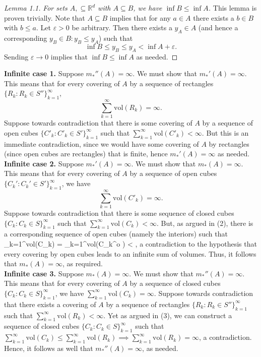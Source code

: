 \begin{proof}[Lemma 1.1]
\emph{For sets \( A, \subseteq \mathbb{R}^{d}  \) with \( A \subseteq B \), we have \( \inf B \leq \inf A \).}
This lemma is proven trivially. Note that \( A \subseteq B \) implies that for any \( a \in A \) there exists a \( b \in B \) with \( b \leq a \). Let \( \varepsilon > 0 \) be arbitrary. Then there exists a \( y_A \in A \) (and hence a corresponding \( y_B \in B : y_B \leq y_A \)) such that \[\inf B \leq y_B \leq y_A < \inf A + \varepsilon.\] Sending \( \varepsilon  \to 0 \) implies that \( \inf B \leq \inf A \) as needed.
\end{proof}

\noindent \textbf{Infinite case 1.} Suppose \( m_*''(A) = \infty  \). We must show that \( m_*'(A) = \infty  \). This means that for every covering of \( A \) by a sequence of rectangles \( \{ R_k : R_k \in S''\}_{k=1}^{\infty}  \), \[\sum_{k=1}^{\infty}\mbox{vol}(R_k) = \infty.\] Suppose towards contradiction that there is some covering of \( A \) by a sequence of open cubes \( \{ C'_k : C'_k \in S'  \}_{k=1}^{\infty}    \) such that \(\sum_{k=1}^{\infty}\mbox{vol}(C'_k) < \infty. \) But this is an immediate contradiction, since we would have some covering of \( A \) by rectangles (since open cubes are rectangles) that is finite, hence \( m_*'(A) = \infty  \) as needed. \\


\noindent \textbf{Infinite case 2.} Suppose \( m_*'(A) = \infty  \). We must show that \( m_*(A) = \infty. \) This means that for every covering of \( A \) by a sequence of open cubes \( \{ C_k' : C_k' \in S' \}_{k=1}^{\infty}    \), we have \[\sum_{k=1}^{\infty}\mbox{vol}(C'_k) = \infty. \] Suppose towards contradiction that there is some sequence of closed cubes \( \{ C_k : C_k \in S\}_{k=1}^{\infty}    \) such that \( \sum_{k=1}^{\infty}\mbox{vol}(C_k) < \infty .\) But, as argued in (2), there is a corresponding sequence of open cubes (namely the interiors) such that \sum_{k=1}^{\infty}\mbox{vol}(C_k) = \sum_{k=1}^{\infty}\mbox{vol}(C_k^{o} ) < \infty\), a contradiction to the hypothesis that every covering by open cubes leads to an infinite sum of volumes. Thus, it follows that \( m_*(A) = \infty \), as required.    \\

\noindent\textbf{Infinite case 3.} Suppose \( m_*(A) = \infty \). We must show that \( m_*''(A) = \infty  \). This means that for every covering of \( A \) by a sequence of closed cubes \( \{ C_k : C_k \in S \} _{k=1} ^{\infty}  \), we have \( \sum_{k=1}^{\infty}\mbox{vol}(C_k) = \infty. \) Suppose towards contradiction that there exists a covering of \( A \) by a sequence of rectangles \( \{ R_k : R_k \in S'' \}_{k=1} ^{\infty}   \) such that \( \sum_{k=1}^{\infty}\mbox{vol}(R_k) < \infty \). Yet as argued in (3), we can construct a sequence of closed cubes \( \{ C_k : C_k \in S \}_{k=1} ^{\infty}  \) such that \( \sum_{k=1}^{\infty}\mbox{vol}(C_k) \leq \sum_{k=1}^{\infty}\mbox{vol}(R_k) \implies \sum_{k=1}^{\infty}\mbox{vol}(R_k) = \infty   \), a contradiction. Hence, it follows as well that \( m_*''(A) = \infty  \), as needed.
